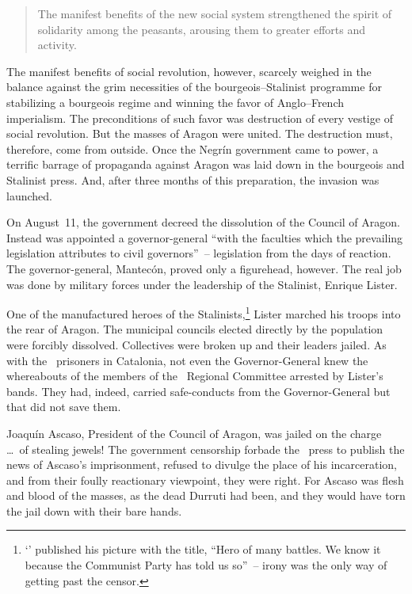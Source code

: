 \begin{quotation}
  The manifest benefits of the new social system strengthened the spirit of solidarity among the peasants, arousing them to greater efforts and activity.
\end{quotation}

\begin{sloppypar}
The manifest benefits of social revolution, however, scarcely weighed in the balance against the grim necessities of the bourgeois--Stalinist programme for stabilizing a bourgeois regime and winning the favor of Anglo--French imperialism. The preconditions of such favor was destruction of every vestige of social revolution. But the masses of Aragon were united. The destruction must, therefore, come from outside. Once the Negr\'in government came to power, a terrific barrage of propaganda against Aragon was laid down in the bourgeois and Stalinist press. And, after three months of this preparation, the invasion was launched.
\end{sloppypar}

On August~11, the government decreed the dissolution of the Council of Aragon. Instead was appointed a governor-general ``with the faculties which the prevailing legislation attributes to civil governors''~-- legislation from the days of reaction. The governor-general, Mantec\'on, proved only a figurehead, however. The real job was done by military forces under the leadership of the Stalinist, Enrique Lister.

One of the manufactured heroes of the Stalinists,\kn\kn\footnote{`\CNT' published his picture with the title, ``Hero of many battles. We know it because the Communist Party has told us so''~-- irony was the only way of getting past the censor.} Lister marched his troops into the rear of Aragon. The municipal councils elected directly by the population were forcibly dissolved. Collectives were broken up and their leaders jailed. As with the \POUM\ prisoners in Catalonia, not even the Governor-General knew the whereabouts of the members of the \CNT\ Regional Committee arrested by Lister’s bands. They had, indeed, carried safe-conducts from the Governor-General but that did not save them.

Joaqu\'in Ascaso, President of the Council of Aragon, was jailed on the charge \dots\ of stealing jewels! The government censorship forbade the \CNT\ press to publish the news of Ascaso’s imprisonment, refused to divulge the place of his incarceration, and from their foully reactionary viewpoint, they were right. For Ascaso was flesh and blood of the masses, as the dead Durruti had been, and they would have torn the jail down with their bare hands.

